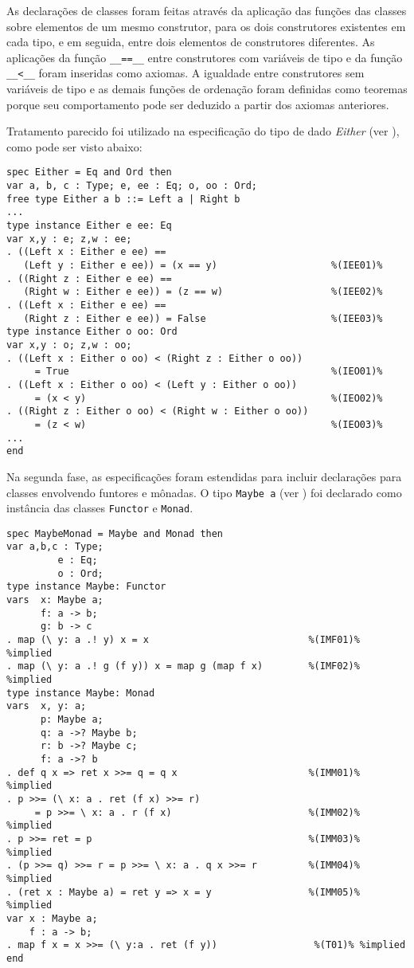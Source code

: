 As declarações de classes foram feitas através da aplicação das funções das classes sobre elementos de um mesmo construtor, para os dois construtores existentes em cada tipo, e em seguida, entre dois elementos de construtores diferentes.
As aplicações  da função \Verb.__==__. entre construtores com variáveis de tipo e da função \Verb.__<__. foram inseridas como axiomas.
A igualdade entre construtores sem variáveis de tipo e as demais funções de ordenação foram definidas como teoremas porque seu comportamento pode ser deduzido a partir dos axiomas anteriores.

Tratamento parecido foi utilizado na especificação do tipo de dado \textit{Either} (ver ), como pode ser visto abaixo:

\begin{Verbatim}
spec Either = Eq and Ord then
var a, b, c : Type; e, ee : Eq; o, oo : Ord;
free type Either a b ::= Left a | Right b     
...
type instance Either e ee: Eq
var x,y : e; z,w : ee;
. ((Left x : Either e ee) == 
   (Left y : Either e ee)) = (x == y)                    %(IEE01)%
. ((Right z : Either e ee) ==
   (Right w : Either e ee)) = (z == w)                   %(IEE02)%
. ((Left x : Either e ee) ==
   (Right z : Either e ee)) = False                      %(IEE03)%
type instance Either o oo: Ord
var x,y : o; z,w : oo;
. ((Left x : Either o oo) < (Right z : Either o oo))
     = True                                              %(IEO01)%
. ((Left x : Either o oo) < (Left y : Either o oo))
     = (x < y)                                           %(IEO02)%
. ((Right z : Either o oo) < (Right w : Either o oo))
     = (z < w)                                           %(IEO03)%
...
end
\end{Verbatim}

Na segunda fase, as especificações foram estendidas para incluir declarações para classes envolvendo funtores e mônadas.
O tipo \Verb.Maybe a. (ver ) foi declarado como instância das classes \Verb.Functor. e \Verb.Monad..

\begin{Verbatim}
spec MaybeMonad = Maybe and Monad then
var a,b,c : Type;
         e : Eq;
         o : Ord;
type instance Maybe: Functor
vars  x: Maybe a;
      f: a -> b;
      g: b -> c
. map (\ y: a .! y) x = x                            %(IMF01)% %implied
. map (\ y: a .! g (f y)) x = map g (map f x)        %(IMF02)% %implied
type instance Maybe: Monad
vars  x, y: a;
      p: Maybe a;
      q: a ->? Maybe b;
      r: b ->? Maybe c;
      f: a ->? b
. def q x => ret x >>= q = q x                       %(IMM01)% %implied
. p >>= (\ x: a . ret (f x) >>= r)
     = p >>= \ x: a . r (f x)                        %(IMM02)% %implied
. p >>= ret = p                                      %(IMM03)% %implied
. (p >>= q) >>= r = p >>= \ x: a . q x >>= r         %(IMM04)% %implied
. (ret x : Maybe a) = ret y => x = y                 %(IMM05)% %implied
var x : Maybe a;
    f : a -> b;
. map f x = x >>= (\ y:a . ret (f y))                 %(T01)% %implied
end
\end{Verbatim}

